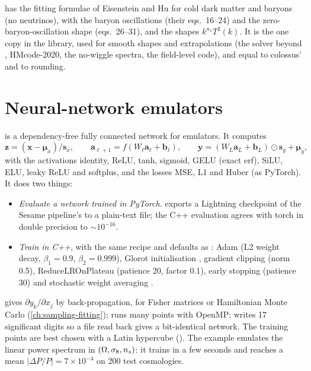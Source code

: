  has the fitting formulae of Eisenstein and Hu \cite{EisensteinHu1998} for cold dark matter and baryons
(no neutrinos), with the baryon oscillations (their eqs.~16--24) and the zero-baryon-oscillation shape (eqs.~26--31), and the
shapes $k^{n_s}T^2(k)$. It is the one copy in the library, used for smooth shapes and extrapolations (the solver beyond
, HMcode-2020, the no-wiggle spectra, the field-level code), and equal to colossus' 
and  to rounding.

\section{Neural-network emulators}\label{sec:fit-nn}

 is a dependency-free fully connected network for emulators. It computes
\begin{equation}
\bm z=(\bm x-\bm\mu_x)/\bm s_x,\qquad \bm a_{\ell+1}=f(W_\ell\bm a_\ell+\bm b_\ell),\qquad
\bm y=(W_L\bm a_L+\bm b_L)\odot\bm s_y+\bm\mu_y,
\end{equation}
with the activations identity, ReLU, tanh, sigmoid, GELU (exact erf), SiLU, ELU, leaky ReLU and softplus, and the losses MSE,
L1 and Huber (as PyTorch). It does two things:
\begin{itemize}
\item \emph{Evaluate a network trained in PyTorch.}  exports a Lightning checkpoint of the
      Sesame pipeline's  to a plain-text file; the C++ evaluation agrees with torch in double precision to
      $\sim10^{-16}$.
\item \emph{Train in C++}, with the same recipe and defaults as : Adam \cite{KingmaBa2014} (L2 weight decay,
      $\beta_1=0.9$, $\beta_2=0.999$), Glorot initialisation \cite{Glorot2010}, gradient clipping (norm 0.5), ReduceLROnPlateau
      (patience 20, factor 0.1), early stopping (patience 30) and stochastic weight averaging \cite{Izmailov2018}.
\end{itemize}
 gives $\partial y_k/\partial x_j$ by back-propagation, for Fisher matrices or Hamiltonian Monte Carlo
(\cref{ch:sampling-fitting});  runs many points with OpenMP;  writes 17 significant digits so a
file read back gives a bit-identical network. The training points are best chosen with a Latin hypercube
\cite{McKay1979} (). The example emulates the linear power spectrum in $(\Omega,\sigma_8,n_s)$: it trains in
a few seconds and reaches a mean $|\Delta P/P|=7\times10^{-4}$ on 200 test cosmologies.

